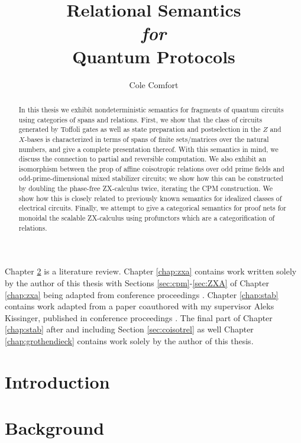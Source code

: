 \documentclass[12pt]{ociamthesis}  %
\title{Relational Semantics \\{ \it \Large for}\\ Quantum Protocols}
\author{Cole Comfort}
\begin{document}
\maketitle


\begin{abstract}
In this thesis we exhibit nondeterministic semantics for fragments of quantum circuits using  categories of spans and relations.  First, we show that the class of circuits generated by Toffoli gates as well as state preparation and postselection in the $Z$ and $X$-bases is characterized in terms of spans of finite sets/matrices over the natural numbers, and give a complete presentation thereof. With this semantics in mind, we discuss the connection to partial and reversible computation. We also exhibit an isomorphism between the prop of affine coisotropic relations over odd prime fields and odd-prime-dimensional mixed stabilizer circuits; we show how this can be constructed by doubling the phase-free ZX-calculus twice, iterating the CPM construction.   We show how this is closely related to previously known semantics for idealized classes of electrical circuits.     Finally, we attempt to give a categorical semantics for proof nets for monoidal the scalable ZX-calculus using profunctors which are a categorification of relations.
\end{abstract}

\begin{originality}
Chapter \ref{chap:background} is a literature review.  Chapter \ref{chap:zxa} contains work written solely by the author of this thesis with Sections \ref{sec:cpm}-\ref{sec:ZXA} of Chapter \ref{chap:zxa} being adapted from conference proceedings \cite{zxa}.  Chapter \ref{chap:stab} contains work adapted from a paper coauthored with my supervisor Aleks Kissinger, published in conference proceedings \cite{lagrel}.  The final part of Chapter  \ref{chap:stab} after and including Section \ref{sec:coisotrel} as well Chapter \ref{chap:grothendieck} contains work solely by the author of this thesis.
\end{originality}

\tableofcontents

\chapter{Introduction}
\label{chap:intro}


\chapter{Background}
\label{chap:background}





\end{document}
